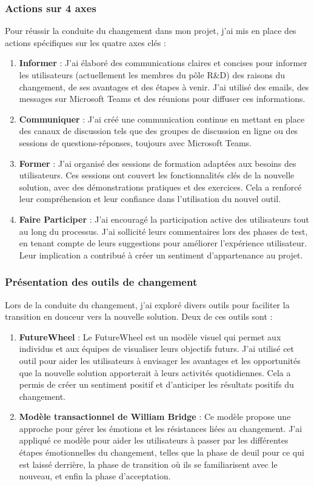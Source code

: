 \documentclass[a4paper, 11pt]{report}
\begin{document}
\subsubsection{Actions sur 4 axes}
Pour réussir la conduite du changement dans mon projet, j'ai mis en
place des actions spécifiques sur les quatre axes clés :
\begin{enumerate}
\def\labelenumi{\arabic{enumi}.}
\item
  \textbf{Informer} : J'ai élaboré des communications claires et
  concises pour informer les utilisateurs (actuellement les membres du
  pôle R\&D) des raisons du changement, de ses avantages et des étapes à
  venir. J'ai utilisé des emails, des messages sur Microsoft Teams et
  des réunions pour diffuser ces informations.
\item
  \textbf{Communiquer} : J'ai créé une communication continue en mettant
  en place des canaux de discussion tels que des groupes de discussion
  en ligne ou des sessions de questions-réponses, toujours avec
  Microsoft Teams.
\item
  \textbf{Former} : J'ai organisé des sessions de formation adaptées aux
  besoins des utilisateurs. Ces sessions ont couvert les fonctionnalités
  clés de la nouvelle solution, avec des démonstrations pratiques et des
  exercices. Cela a renforcé leur compréhension et leur confiance dans
  l'utilisation du nouvel outil.
\item
  \textbf{Faire Participer} : J'ai encouragé la participation active des
  utilisateurs tout au long du processus. J'ai sollicité leurs
  commentaires lors des phases de test, en tenant compte de leurs
  suggestions pour améliorer l'expérience utilisateur. Leur implication
  a contribué à créer un sentiment d'appartenance au projet.
\end{enumerate}
\subsubsection{Présentation des outils de changement}
Lors de la conduite du changement, j'ai exploré divers outils pour
faciliter la transition en douceur vers la nouvelle solution. Deux de
ces outils sont :
\begin{enumerate}
\def\labelenumi{\arabic{enumi}.}
\item
  \textbf{FutureWheel} : Le FutureWheel est un modèle visuel qui permet
  aux individus et aux équipes de visualiser leurs objectifs futurs.
  J'ai utilisé cet outil pour aider les utilisateurs à envisager les
  avantages et les opportunités que la nouvelle solution apporterait à
  leurs activités quotidiennes. Cela a permis de créer un sentiment
  positif et d'anticiper les résultats positifs du changement.
\item
  \textbf{Modèle transactionnel de William Bridge} : Ce modèle propose
  une approche pour gérer les émotions et les résistances liées au
  changement. J'ai appliqué ce modèle pour aider les utilisateurs à
  passer par les différentes étapes émotionnelles du changement, telles
  que la phase de deuil pour ce qui est laissé derrière, la phase de
  transition où ils se familiarisent avec le nouveau, et enfin la phase
  d'acceptation.
\end{enumerate}
\end{document}
